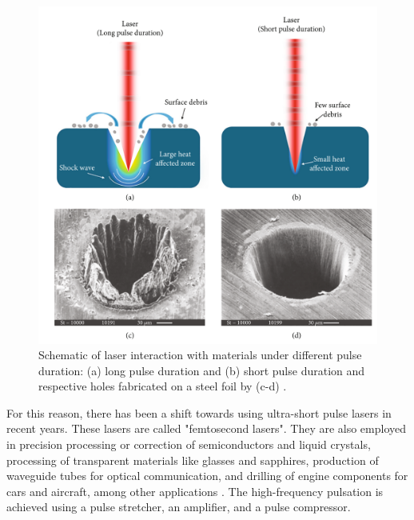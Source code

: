 \begin{figure}
    \centering
    \includegraphics[scale=0.35]{Images/laserpulsing.png}
    \caption[Laser interactions with different pulses.]{Schematic of laser interaction with materials under different pulse duration: (a) long pulse duration and (b) short pulse duration and respective holes fabricated on a steel foil by (c-d) \cite{lin_femtosecond_2021}.}
    \label{fig:pulsations}
\end{figure}
For this reason, there has been a shift towards using ultra-short pulse lasers in recent years. These lasers are called "femtosecond lasers". They are also employed in precision processing or correction of semiconductors and liquid crystals, processing of transparent materials like glasses and sapphires, production of waveguide tubes for optical communication, and drilling of engine components for cars and aircraft, among other applications \cite{katayama_fundamentals_2020}. The high-frequency pulsation is achieved using a pulse stretcher, an amplifier, and a pulse compressor.
